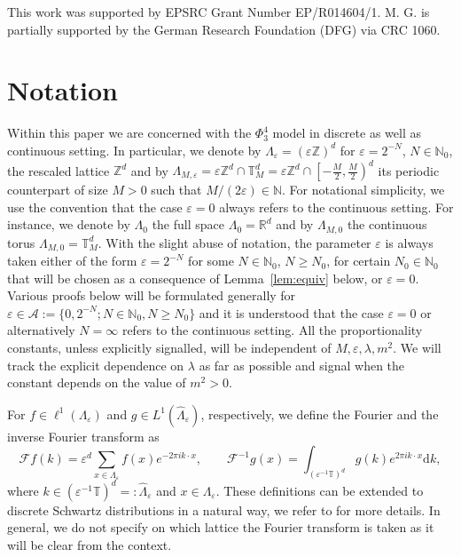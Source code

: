 \documentclass[a4paper,11pt]{article}
\newcommand{\assign}{:=}
\newcommand{\backassign}{=:}
\newcommand{\cdummy}{\cdot}
\newcommand{\mathd}{\mathrm{d}}
\numberwithin{equation}{section}
\begin{document}
This work was supported by EPSRC
Grant Number EP/R014604/1. M. G. is partially supported by the German Research
Foundation (DFG) via CRC 1060.


\section{Notation}

\label{s:not}Within this paper we are concerned with the $\Phi^4_3$ model in
discrete as well as continuous setting. In particular, we denote by
$\Lambda_{\varepsilon} = (\varepsilon \mathbb{Z})^d$ for $\varepsilon = 2^{-
N}$, $N \in \mathbb{N}_0$, the rescaled lattice $\mathbb{Z}^d$ and by
$\Lambda_{M, \varepsilon} = \varepsilon \mathbb{Z}^d \cap \mathbb{T}^d_M =
\varepsilon \mathbb{Z}^d \cap \left[ - \frac{M}{2}, \frac{M}{2} \right)^d$ its
periodic counterpart of size $M > 0$ such that  $M/(2\varepsilon)\in\mathbb{N}$. For notational simplicity, we use the
convention that the case $\varepsilon = 0$ always refers to the continuous
setting. For instance, we denote by $\Lambda_0$ the full space $\Lambda_0
=\mathbb{R}^d$ and by $\Lambda_{M, 0}$ the continuous torus $\Lambda_{M, 0}
=\mathbb{T}^d_M$. With the slight abuse of notation, the parameter
$\varepsilon$ is always taken either of the form $\varepsilon = 2^{- N}$ for
some $N \in \mathbb{N}_0$, $N \geqslant N_0$, for certain $N_0 \in
\mathbb{N}_0$ that will be chosen as a consequence of Lemma~\ref{lem:equiv}
below, or $\varepsilon = 0$. Various proofs below will be formulated generally
for $\varepsilon \in \mathcal{A} \assign \{ 0, 2^{- N} ; N \in \mathbb{N}_0, N
\geqslant N_0 \}$ and it is understood that the case $\varepsilon = 0$ or
alternatively $N = \infty$ refers to the continuous setting. All the proportionality constants, unless explicitly signalled, will be independent of $M,\varepsilon,\lambda,m^2$. We will track the explicit dependence on $\lambda$ as far as possible and signal when the constant depends on the value of $m^2>0$. 

\medskip

For $f \in \ell^1
(\Lambda_{\varepsilon})$ and $g \in L^1 (\hat{\Lambda}_{\varepsilon})$, respectively, we define the Fourier and the inverse Fourier transform as
\[ \mathcal{F} f (k) = \varepsilon^d \sum_{x \in \Lambda_{\varepsilon}} f (x)
   e^{- 2 \pi i k \cdummy x}, \qquad \mathcal{F}^{- 1} g (x) = \int_{(\varepsilon^{- 1} \mathbb{T})^d} g (k)
   e^{2 \pi i k \cdummy x} \mathd k, \]
   where $k \in (\varepsilon^{- 1} \mathbb{T})^d
   \backassign \hat{\Lambda}_{\varepsilon}$ and $x \in \Lambda_{\varepsilon}$.
These definitions can be extended to discrete Schwartz distributions in a
natural way, we refer to {\cite{MP17}} for more details. In general, we do not
specify on which lattice the Fourier transform is taken as it will be clear
from the context.
\end{document}
